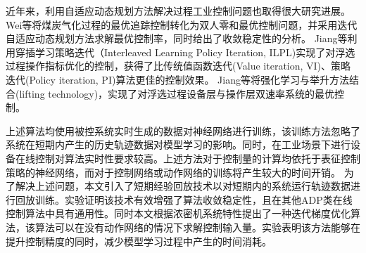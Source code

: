 近年来，利用自适应动态规划方法解决过程工业控制问题也取得很大研究进展。
Wei等\cite{Wei2014}将煤炭气化过程的最优追踪控制转化为双人零和最优控制问题，并采用迭代自适应动态规划方法求解最优控制率，同时给出了收敛稳定性的分析。
Jiang等\cite{Jiang2018}利用穿插学习策略迭代（Interleaved Learning
Policy Iteration,
ILPL)实现了对浮选过程操作指标优化的控制，获得了比传统值函数迭代(Value
iteration, VI)、策略迭代(Policy iteration, PI)算法更佳的控制效果。
Jiang等\cite{Jiang2019}将强化学习与举升方法结合(lifting
technology)，实现了对浮选过程设备层与操作层双速率系统的最优控制。

上述算法均使用被控系统实时生成的数据对神经网络进行训练，该训练方法忽略了系统在短期内产生的历史轨迹数据对模型学习的影响。同时，在工业场景下进行设备在线控制对算法实时性要求较高。上述方法对于控制量的计算均依托于表征控制策略的神经网络，而对于控制网络或动作网络的训练将产生较大的时间开销。
为了解决上述问题，本文引入了短期经验回放技术\cite{Modares2014}\cite{Mnih2013}以对短期内的系统运行轨迹数据进行回放训练。实验证明该技术有效增强了算法收敛稳定性，且在其他ADP类在线控制算法中具有通用性。同时本文根据浓密机系统特性提出了一种迭代梯度优化算法，该算法可以在没有动作网络的情况下求解控制输入量。实验表明该方法能够在提升控制精度的同时，减少模型学习过程中产生的时间消耗。






